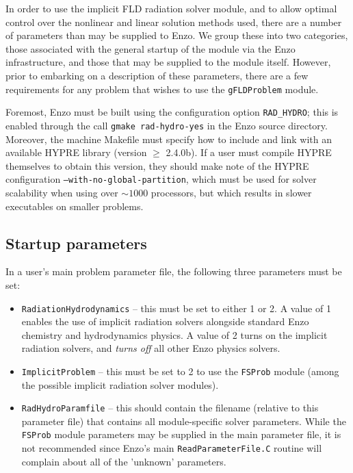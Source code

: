 \documentclass[letterpaper,10pt]{article}
\renewcommand{\(}{\left(}
\renewcommand{\)}{\right)}
\begin{document}
In order to use the implicit FLD radiation solver module, and to
allow optimal control over the nonlinear and linear solution methods
used, there are a number of parameters than may be supplied to Enzo.
We group these into two categories, those associated with the general
startup of the module via the Enzo infrastructure, and those that may
be supplied to the module itself.  However, prior to embarking on a
description of these parameters, there are a few requirements for any
problem that wishes to use the {\tt gFLDProblem} module.

Foremost, Enzo must be built using the configuration option 
{\tt RAD\_HYDRO}; this is enabled through the call 
{\tt gmake rad-hydro-yes} in the Enzo source directory.  Moreover, the
machine Makefile must specify how to include and link with an
available HYPRE library (version $\ge$ 2.4.0b).  If a user must
compile HYPRE themselves to obtain this version, they should make note
of the HYPRE configuration {\tt --with-no-global-partition}, which
must be used for solver scalability when using over $\sim1000$
processors, but which results in slower executables on smaller
problems.


\subsection{Startup parameters}

In a user's main problem parameter file, the following three parameters
must be set:
\begin{itemize}
\item {\tt RadiationHydrodynamics} -- this must be set to either 1 or
  2.  A value of 1 enables the use of implicit radiation solvers
  alongside standard Enzo chemistry and hydrodynamics physics.  A
  value of 2 turns on the implicit radiation solvers, and {\em turns off}  
  all other Enzo physics solvers.
\item {\tt ImplicitProblem} -- this must be set to 2 to use the 
  {\tt FSProb} module (among the possible implicit radiation solver
  modules).
\item {\tt RadHydroParamfile} -- this should contain the filename
  (relative to this parameter file) that contains all module-specific
  solver parameters.  While the {\tt FSProb} module parameters may be
  supplied in the main parameter file, it is not recommended since
  Enzo's main {\tt ReadParameterFile.C} routine will complain about
  all of the 'unknown' parameters.
\end{itemize}
\end{document}
